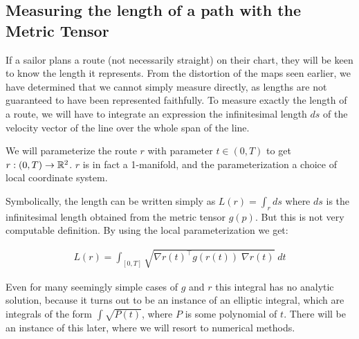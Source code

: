 \subsection*{Measuring the length of a path with the Metric Tensor}
If a sailor plans a route (not necessarily straight) on their chart, they will be keen to know the length it represents. From the distortion of the maps seen earlier, we have determined that we cannot simply measure directly, as lengths are not guaranteed to have been represented faithfully. To measure exactly the length of a route, we will have to integrate an expression the infinitesimal length $ds$ of the velocity vector of the line over the whole span of the line. 
    
We will parameterize the route $r$ with parameter $t \in (0, T)$ to get $r: (0, T) \to \mathbb{R}^2$. $r$ is in fact a 1-manifold, and the parameterization a choice of local coordinate system. 

Symbolically, the length can be written simply as $L(r) = \int_r ds$ where $ds$ is the infinitesimal length obtained from the metric tensor $g(p)$. But this is not very computable definition. By using the local parameterization we get:

\begin{align*} 
    L(r) = \int_{[0, T]} \sqrt{\nabla r(t)^\top g(r(t))\; \nabla r(t)} \; dt
\end{align*}

Even for many seemingly simple cases of $g$ and $r$ this integral has no analytic solution, because it turns out to be an instance of an elliptic integral, which are integrals of the form $\int \sqrt{P(t)}$, where $P$ is some polynomial of $t$. There will be an instance of this later, where we will resort to numerical methods.

